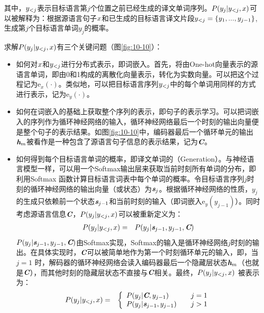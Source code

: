 \vspace{-0.5em}
\noindent 其中，$ {{y}}_{<j }$表示目标语言第$j$个位置之前已经生成的译文单词序列。$ {P} ( y_j | {{y}}_{<j }, {{x}})$可以被解释为：根据源语言句子${{x}} $和已生成的目标语言译文片段${{y}}_{<j }=\{ y_1,..., y_{j-1} \}$,生成第$j$个目标语言单词$y_j$的概率。

\parinterval 求解${P}(y_j | {{y}}_{<j},{{x}})$有三个关键问题（图\ref{fig:10-10}）：

\vspace{-0.5em}
\begin{itemize}
\vspace{0.5em}
\item	如何对${{x}}$和${{y}}_{<j }$进行分布式表示，即词嵌入。首先，将由One-hot向量表示的源语言单词，即由0和1构成的离散化向量表示，转化为实数向量。可以把这个过程记为$\textrm{e}_x (\cdot)$。类似地，可以把目标语言序列${{y}}_{<j }$中的每个单词用同样的方式进行表示，记为$\textrm{e}_y (\cdot)$。
\vspace{0.5em}
\item	如何在词嵌入的基础上获取整个序列的表示，即句子的表示学习。可以把词嵌入的序列作为循环神经网络的输入，循环神经网络最后一个时刻的输出向量便是整个句子的表示结果。如图\ref{fig:10-10}中，编码器最后一个循环单元的输出$\textbf{\em h}_m$被看作是一种包含了源语言句子信息的表示结果，记为$\textbf{\em C}$。
\vspace{0.5em}
\item	如何得到每个目标语言单词的概率，即译文单词的{\small{}}（Generation）。与神经语言模型一样，可以用一个Softmax输出层来获取当前时刻所有单词的分布，即利用Softmax 函数计算目标语言词表中每个单词的概率。令目标语言序列$j$时刻的循环神经网络的输出向量（或状态）为$\textbf{\em s}_j$。根据循环神经网络的性质，$ y_j$ 的生成只依赖前一个状态$\textbf{\em s}_{j-1}$和当前时刻的输入（即词嵌入$\textrm{e}_y (y_{j-1})$）。同时考虑源语言信息$\textbf{\em C}$，${P}(y_j  | {{y}}_{<j},{{x}})$可以被重新定义为：
\begin{eqnarray}
{P} (y_j | {{y}}_{<j},{{x}}) &=& {P} ( {y_j | \textbf{\em s}_{j-1} ,y_{j-1},\textbf{\em C}} )
\label{eq:10-3}
\end{eqnarray}
${P}({y_j | \textbf{\em s}_{j-1} ,y_{j-1},\textbf{\em C}})$由Softmax实现，Softmax的输入是循环神经网络$j$时刻的输出。在具体实现时，$\textbf{\em C}$可以被简单地作为第一个时刻循环单元的输入，即，当$j=1$ 时，解码器的循环神经网络会读入编码器最后一个隐藏层状态$ \textbf{\em h}_m$（也就是$\textbf{\em C}$），而其他时刻的隐藏层状态不直接与$\textbf{\em C}$相关。最终，${P} (y_j | {{y}}_{<j},{{x}})$ 被表示为：
\begin{eqnarray}
{P} (y_j | {{y}}_{<j},{{x}}) &=&
 \left \{ \begin{array}{ll}
{P} (y_j |\textbf{\em C} ,y_{j-1}) &j=1 \\
{P} (y_j|\textbf{\em s}_{j-1},y_{j-1})  \quad &j>1
\end{array} \right .
\label{eq:10-4}
\end{eqnarray}
\vspace{0.5em}
\end{itemize}
